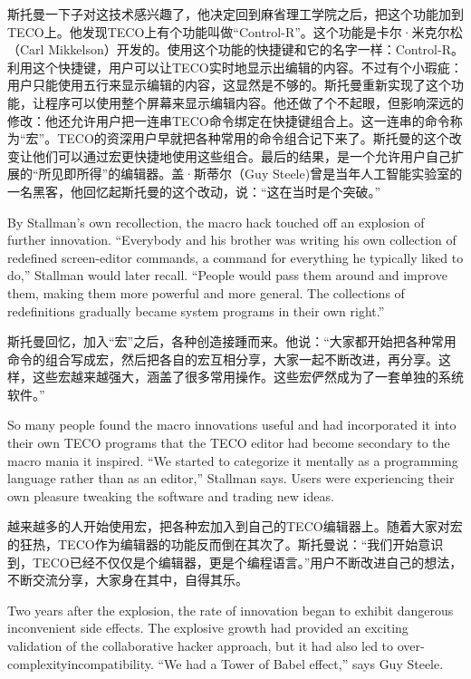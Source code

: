 \fi
\ifdefined\vtwo
斯托曼一下子对这技术感兴趣了，他决定回到麻省理工学院之后，把这个功能加到TECO上。他发现TECO上有个功能叫做``Control-R''。这个功能是卡尔·米克尔松（Carl Mikkelson）开发的。使用这个功能的快捷键和它的名字一样：Control-R。利用这个快捷键，用户可以让TECO实时地显示出编辑的内容。不过有个小瑕疵：用户只能使用五行来显示编辑的内容，这显然是不够的。斯托曼重新实现了这个功能，让程序可以使用整个屏幕来显示编辑内容。他还做了个不起眼，但影响深远的修改：他还允许用户把一连串TECO命令绑定在快捷键组合上。这一连串的命令称为``宏''。TECO的资深用户早就把各种常用的命令组合记下来了。斯托曼的这个改变让他们可以通过宏更快捷地使用这些组合。最后的结果，是一个允许用户自己扩展的``所见即所得''的编辑器。盖·斯蒂尔（Guy Steele)曾是当年人工智能实验室的一名黑客，他回忆起斯托曼的这个改动，说：``这在当时是个突破。''
\fi
\fi

\ifdefined\eng
By Stallman's own recollection, the macro hack touched off an explosion of further innovation. ``Everybody and his brother was writing his own collection of redefined screen-editor commands, a command for everything he typically liked to do,'' Stallman would later recall. ``People would pass them around and improve them, making them more powerful and more general. The collections of redefinitions gradually became system programs in their own right.''
\fi

\ifdefined\chs
斯托曼回忆，加入``宏''之后，各种创造接踵而来。他说：``大家都开始把各种常用命令的组合写成宏，然后把各自的宏互相分享，大家一起不断改进，再分享。这样，这些宏越来越强大，涵盖了很多常用操作。这些宏俨然成为了一套单独的系统软件。''
\fi

\ifdefined\eng
So many people found the macro innovations useful and had incorporated it into their own TECO programs that the TECO editor had become secondary to the macro mania it inspired. ``We started to categorize it mentally as a programming language rather than as an editor,'' Stallman says. Users were experiencing their own pleasure tweaking the software and trading new ideas.
\fi

\ifdefined\chs
越来越多的人开始使用宏，把各种宏加入到自己的TECO编辑器上。随着大家对宏的狂热，TECO作为编辑器的功能反而倒在其次了。斯托曼说：``我们开始意识到，TECO已经不仅仅是个编辑器，更是个编程语言。''用户不断改进自己的想法，不断交流分享，大家身在其中，自得其乐。
\fi

\ifdefined\eng
Two years after the explosion, the rate of innovation began to exhibit \ifdefined\vone dangerous \fi\ifdefined\vtwo inconvenient \fi side effects. The explosive growth had provided an exciting validation of the collaborative hacker approach, but it had also led to \ifdefined\vone over-complexity\fi\ifdefined\vtwo incompatibility\fi . ``We had a Tower of Babel effect,'' says Guy Steele.
\fi

